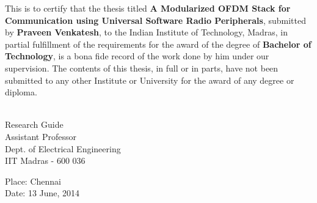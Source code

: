 \certificate

\vspace*{0.5in}

\noindent This is to certify that the thesis titled {\bf A Modularized OFDM
Stack for Communication using Universal Software Radio Peripherals}, submitted
by {\bf Praveen Venkatesh}, to the Indian Institute of Technology, Madras, in
partial fulfillment of the requirements for the award of the degree of {\bf
Bachelor of Technology}, is a bona fide record of the work done by him under
our supervision. The contents of this thesis, in full or in parts, have not
been submitted to any other Institute or University for the award of any degree
or diploma.

\vspace*{1.5in}

\begin{singlespacing}
\hspace*{-0.25in}
\parbox{2.5in}{
	 \\
	\noindent Research Guide \\
	\noindent Assistant Professor \\
	\noindent Dept. of Electrical Engineering\\
	\noindent IIT Madras - 600 036 \\
}
\hspace*{1.0in}
\end{singlespacing}

\vspace*{0.25in}

\noindent Place: Chennai \\
Date: 13 June, 2014
